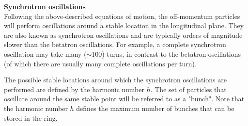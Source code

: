 

\textbf{Synchrotron oscillations}\\
Following the above-described equations of motion, the off-momentum particles will perform oscillations around a stable location in the longitudinal plane.  They are also known as synchrotron oscillations and are typically orders of magnitude slower than the betatron oscillations. For example, a complete synchrotron oscillation may take many ($\sim$100) turns, in contrast to the betatron oscillations (of which there are usually many complete oscillations per turn).

The possible stable locations around which the synchrotron oscillations are performed are defined by the harmonic number $h$. The set of particles that oscillate around the same stable point will be referred to as a "bunch". Note that the harmonic number $h$ defines the maximum number of bunches that can be stored in the ring.


